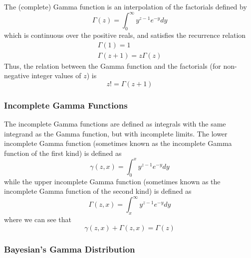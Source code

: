 \documentclass[11pt]{report} %
\begin{document}
The (complete) Gamma function is an interpolation of the factorials defined by
\begin{equation}
\Gamma\left(z\right) = \int_{0}^{\infty}y^{z - 1}e^{-y}dy
\end{equation}
which is continuous over the positive reals, and satisfies the recurrence relation
\begin{gather}
\Gamma\left(1\right) = 1 \\
\Gamma\left(z + 1\right) = z\Gamma\left(z\right)
\end{gather}
Thus, the relation between the Gamma function and the factorials (for non-negative integer values of $z$) is
\begin{equation}
z! = \Gamma\left(z + 1\right)
\end{equation}

\subsubsection{Incomplete Gamma Functions}

The incomplete Gamma functions are defined as integrals with the same integrand as the Gamma function, but with incomplete limits. The lower incomplete Gamma function (sometimes known as the incomplete Gamma function of the first kind) is defined as
\begin{equation}
\gamma\left(z, x\right) = \int_{0}^{x}y^{z - 1}e^{-y}dy
\end{equation}
while the upper incomplete Gamma function (sometimes known as the incomplete Gamma function of the second kind) is defined as
\begin{equation}
\Gamma\left(z, x\right) = \int_{x}^{\infty}y^{z - 1}e^{-y}dy
\end{equation}
where we can see that
\begin{equation}
\gamma\left(z, x\right) + \Gamma\left(z, x\right) = \Gamma\left(z\right)
\end{equation}

\subsubsection{Bayesian's Gamma Distribution}
\end{document}
